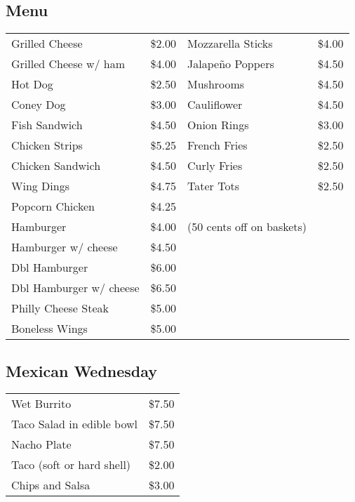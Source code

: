 \documentclass[a0,landscape]{a0poster}
\begin{document}
\begin{multicols}{4}
\subsection*{Menu}
\begin{center}
\begin{tabular}{ l r | l r}
Grilled Cheese & \$2.00 & Mozzarella Sticks & \$4.00 \\
Grilled Cheese w/ ham & \$4.00 & Jalapeño Poppers & \$4.50 \\
Hot Dog & \$2.50 & Mushrooms & \$4.50 \\
Coney Dog & \$3.00 & Cauliflower & \$4.50 \\
Fish Sandwich & \$4.50 & Onion Rings & \$3.00 \\
Chicken Strips & \$5.25 & French Fries & \$2.50 \\
Chicken Sandwich & \$4.50 & Curly Fries & \$2.50 \\
Wing Dings & \$4.75 & Tater Tots & \$2.50 \\
Popcorn Chicken & \$4.25 & &\\
Hamburger & \$4.00 & (50 cents off on baskets) & \\
Hamburger w/ cheese & \$4.50 & & \\
Dbl Hamburger & \$6.00 & & \\
Dbl Hamburger w/ cheese & \$6.50 & & \\
Philly Cheese Steak & \$5.00 & & \\
Boneless Wings & \$5.00 & & \\
\end{tabular}
\end{center}

\vspace{1cm}

\subsection*{Mexican Wednesday}
\begin{center}
\begin{tabular}{ l r }
Wet Burrito & \$7.50 \\
Taco Salad in edible bowl & \$7.50 \\
Nacho Plate & \$7.50 \\
Taco (soft or hard shell) & \$2.00 \\
Chips and Salsa & \$3.00 \\
\end{tabular}
\end{center}


\end{multicols}
\end{document}
